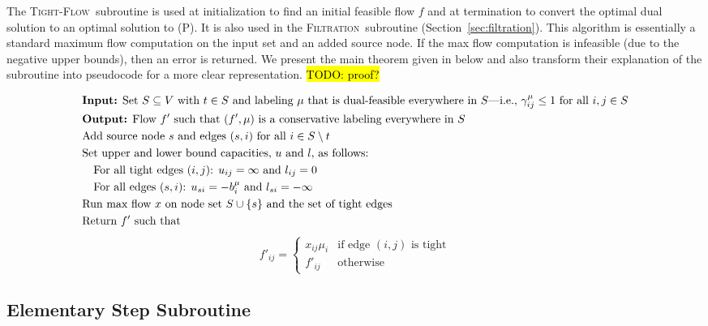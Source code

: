 \documentclass[11pt]{article}
\newtheorem{theorem}{Theorem}[section]
\theoremstyle{definition}
\theoremstyle{definition}
\newcommand{\biu}{b_{i}^{\mu}}
\newcommand{\giij}{\gamma_{ij}^{\mu}}
\newcommand{\tf}{\textsc{Tight-Flow}}
\newcommand{\filtration}{\textsc{Filtration}}
\newcommand{\todo}[1]{\hl{TODO: #1}}
\begin{document}
	The \tf\ subroutine is used at initialization to find an initial feasible flow $f$ and at
    termination to convert the optimal dual solution to an optimal solution to (P).
    It is also used in the \filtration\ subroutine (Section~\ref{sec:filtration}).
    This algorithm is essentially a standard maximum flow computation on the input
    set and an added source node. If the max flow computation is infeasible (due to the
    negative upper bounds), then an error is returned. We present the main theorem
    given in \cite{Vegh2013} below and also transform their explanation of the
    subroutine into pseudocode for a more clear representation.
	\todo{proof?}

	\begin{align*}
	&\text{\textbf{Input:} Set $S \subseteq V$ with $t \in S$ and labeling $\mu$ that is
           dual-feasible everywhere in $S$---i.e., $\giij \leq 1$ for all $i, j \in S$} \\
	&\text{\textbf{Output:} Flow $f'$ such that $(f', \mu)$ is a conservative labeling
           everywhere in $S$} \\
	&\text{Add source node $s$ and edges $(s, i)$ for all $i \in S \setminus t$} \\
	&\text{Set upper and lower bound capacities, $u$ and $l$, as follows: } \\
	&\quad \text{For all tight edges $(i, j)$: $u_{ij} = \infty$ and $l_{ij} = 0$} \\
	&\quad \text{For all edges $(s, i)$: $u_{si} = -\biu$ and $l_{si} = -\infty$} \\
	&\text{Run max flow $x$ on node set $S \cup \{s\}$ and the set of tight edges} \\
	&\text{Return $f'$ such that}
    \end{align*}
    \[ f'_{ij} = \begin{cases} x_{ij} \mu_i & \text{if edge } (i, j) \text{ is tight} \\
    					       f'_{ij}      & \text{otherwise}
                 \end{cases}
    \]
	
	\subsection{Elementary Step Subroutine}\label{sec:es}
    
\end{document}
